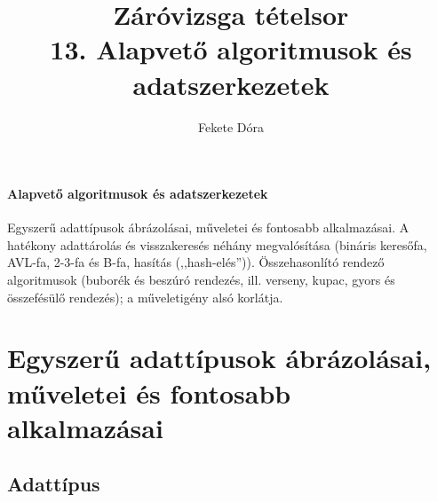 \documentclass[margin=0px]{article}
\title{Záróvizsga tételsor \\ \large 13. Alapvető algoritmusok és adatszerkezetek}
\date{}
\author{Fekete Dóra}
\newenvironment{tetel}[1]{\paragraph{#1 \\}}{}
\begin{document}
	\maketitle
	
	\begin{tetel}{Alapvető algoritmusok és adatszerkezetek}
			Egyszerű adattípusok ábrázolásai, műveletei és fontosabb alkalmazásai. A hatékony adattárolás és visszakeresés néhány megvalósítása (bináris keresőfa, AVL-fa, 2-3-fa és B-fa, hasítás (,,hash-elés”)). Összehasonlító rendező algoritmusok (buborék és beszúró rendezés, ill. verseny, kupac, gyors és összefésülő rendezés); a műveletigény alsó korlátja.
	\end{tetel}
	
	\section{Egyszerű adattípusok ábrázolásai, műveletei és fontosabb alkalmazásai}
	
	\subsection{Adattípus}
	
\end{document}
